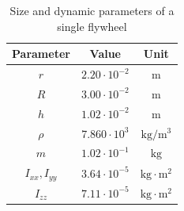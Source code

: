 \documentclass[letterpaper, 10 pt, conference]{ieeeconf}      %
\begin{document}
\begin{table}
	\centering
	\caption{\small Size and dynamic parameters of a single flywheel}
	\begin{tabular}{ccc}
		Parameter & Value & Unit \\
		\hline
		\hline
		$r$ & $2.20\cdot 10^{-2}$ & $\mathrm{m}$ \\
		$R$ & $3.00\cdot 10^{-2}$ & $\mathrm{m}$ \\
		$h$   & $1.02\cdot 10^{-2}$ & $\mathrm{m}$ \\
		$\rho$   & $7.860 \cdot 10^{3}$ & $\mathrm{kg/m^3}$ \\
		$m$   & $1.02\cdot 10^{-1}$ & $\mathrm{kg}$ \\
		$I_{xx}, I_{yy}$   & $3.64 \cdot 10^{-5}$ & $\mathrm{kg \cdot m^2}$ \\
		$I_{zz}$   & $7.11 \cdot 10^{-5}$ & $ \mathrm{kg \cdot m^2}$ \\
	\end{tabular}
	\label{tab:dim_fw}
\end{table}
\end{document}
